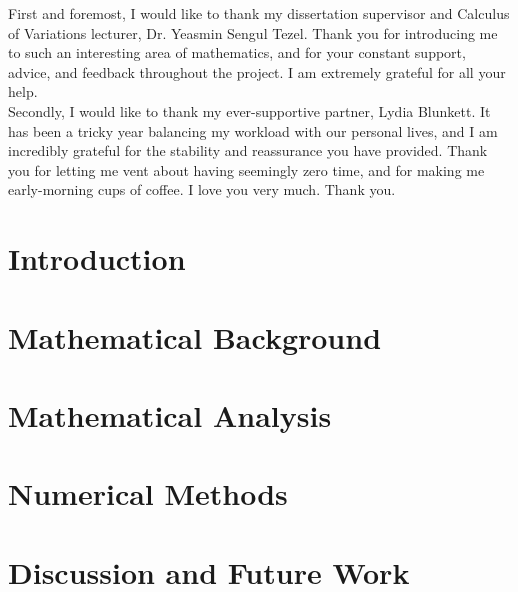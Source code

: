 \documentclass[12pt]{report}
\theoremstyle{plain}
\theoremstyle{definition}
\begin{document}
First and foremost, I would like to thank my dissertation supervisor and Calculus of Variations lecturer, Dr. Yeasmin Sengul Tezel. Thank you for introducing me to such an interesting area of mathematics, and for your constant support, advice, and feedback throughout the project. I am extremely grateful for all your help.
\\

\noindent Secondly, I would like to thank my ever-supportive partner, Lydia Blunkett. It has been a tricky year balancing my workload with our personal lives, and I am incredibly grateful for the stability and reassurance you have provided. Thank you for letting me vent about having seemingly zero time, and for making me early-morning cups of coffee. I love you very much. Thank you.

\clearpage

\tableofcontents
{}

\clearpage

\listoffigures
{}
\clearpage

\listoftables
{}

\clearpage


\chapter{Introduction}


\chapter{Mathematical Background}



\chapter{Mathematical Analysis}
\label{chp: Mathematical Analysis}


\chapter{Numerical Methods}


\chapter{Discussion and Future Work}




\end{document}
